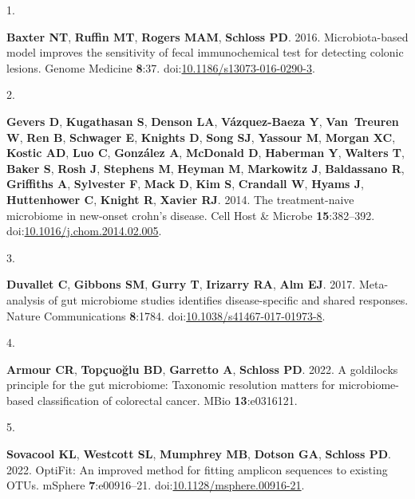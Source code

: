 \documentclass[
]{article}
\newlength{\cslhangindent}
\newlength{\csllabelwidth}
\newlength{\cslentryspacingunit} %
\newenvironment{CSLReferences}[2] %
 {%
  \setlength{\parindent}{0pt}
  \ifodd #1
  \let\oldpar\par
  \def\par{\hangindent=\cslhangindent\oldpar}
  \fi
  \setlength{\parskip}{#2\cslentryspacingunit}
 }%
 {}
\newcommand{\CSLLeftMargin}[1]{\parbox[t]{\csllabelwidth}{#1}}
\newcommand{\CSLRightInline}[1]{\parbox[t]{\linewidth - \csllabelwidth}{#1}\break}
\begin{document}
\hypertarget{refs}{}
\begin{CSLReferences}{0}{1}
\leavevmode{}%
\CSLLeftMargin{1. }%
\CSLRightInline{\textbf{Baxter NT}, \textbf{Ruffin MT}, \textbf{Rogers
MAM}, \textbf{Schloss PD}. 2016. Microbiota-based model improves the
sensitivity of fecal immunochemical test for detecting colonic lesions.
Genome Medicine \textbf{8}:37.
doi:\href{https://doi.org/10.1186/s13073-016-0290-3}{10.1186/s13073-016-0290-3}.}

\leavevmode{}%
\CSLLeftMargin{2. }%
\CSLRightInline{\textbf{Gevers D}, \textbf{Kugathasan S}, \textbf{Denson
LA}, \textbf{Vázquez-Baeza Y}, \textbf{Van~Treuren W}, \textbf{Ren B},
\textbf{Schwager E}, \textbf{Knights D}, \textbf{Song SJ},
\textbf{Yassour M}, \textbf{Morgan XC}, \textbf{Kostic AD}, \textbf{Luo
C}, \textbf{González A}, \textbf{McDonald D}, \textbf{Haberman Y},
\textbf{Walters T}, \textbf{Baker S}, \textbf{Rosh J}, \textbf{Stephens
M}, \textbf{Heyman M}, \textbf{Markowitz J}, \textbf{Baldassano R},
\textbf{Griffiths A}, \textbf{Sylvester F}, \textbf{Mack D}, \textbf{Kim
S}, \textbf{Crandall W}, \textbf{Hyams J}, \textbf{Huttenhower C},
\textbf{Knight R}, \textbf{Xavier RJ}. 2014. The treatment-naive
microbiome in new-onset crohn{'}s disease. Cell Host \& Microbe
\textbf{15}:382--392.
doi:\href{https://doi.org/10.1016/j.chom.2014.02.005}{10.1016/j.chom.2014.02.005}.}

\leavevmode{}%
\CSLLeftMargin{3. }%
\CSLRightInline{\textbf{Duvallet C}, \textbf{Gibbons SM}, \textbf{Gurry
T}, \textbf{Irizarry RA}, \textbf{Alm EJ}. 2017. Meta-analysis of gut
microbiome studies identifies disease-specific and shared responses.
Nature Communications \textbf{8}:1784.
doi:\href{https://doi.org/10.1038/s41467-017-01973-8}{10.1038/s41467-017-01973-8}.}

\leavevmode{}%
\CSLLeftMargin{4. }%
\CSLRightInline{\textbf{Armour CR}, \textbf{Topçuoğlu BD},
\textbf{Garretto A}, \textbf{Schloss PD}. 2022. A goldilocks principle
for the gut microbiome: Taxonomic resolution matters for
microbiome-based classification of colorectal cancer. MBio
\textbf{13}:e0316121.}

\leavevmode{}%
\CSLLeftMargin{5. }%
\CSLRightInline{\textbf{Sovacool KL}, \textbf{Westcott SL},
\textbf{Mumphrey MB}, \textbf{Dotson GA}, \textbf{Schloss PD}. 2022.
OptiFit: An improved method for fitting amplicon sequences to existing
OTUs. mSphere \textbf{7}:e00916--21.
doi:\href{https://doi.org/10.1128/msphere.00916-21}{10.1128/msphere.00916-21}.}


\end{CSLReferences}
\end{document}
